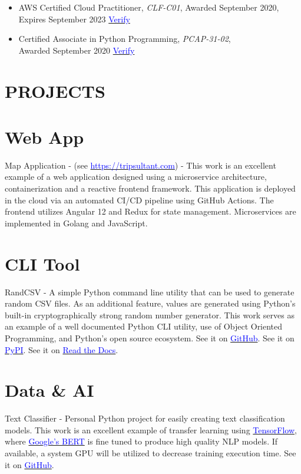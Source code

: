 \documentclass[margin]{res}
\begin{document}
\begin{resume}
\begin{itemize}
		\item AWS Certified Cloud Practitioner, \textit{CLF-C01}, Awarded September 2020, Expires September 2023
		      \href{https://www.youracclaim.com/badges/48063b2f-6f7f-4b6c-a040-5c42393c4bc0}{\textcolor{blue}{Verify}}


		\item Certified Associate in Python Programming, \textit{PCAP-31-02}, \\
		      Awarded September 2020 \href{https://www.youracclaim.com/badges/bfd6aae6-1ab4-461b-8a62-f25cfb0bd29d}{\textcolor{blue}{Verify}}

	\end{itemize}

	\section{\textcolor{NavyBlue}{PROJECTS}}
	\normalsize{\section{Web App}}
	Map Application - (see \href{https://tripsultant.com}{\textcolor{blue}{\url{https://tripsultant.com}}}) - This work is an excellent example of a web application
	designed using a microservice architecture, containerization and a reactive frontend framework. This application is deployed in the
	cloud via an automated CI/CD pipeline using GitHub Actions. The frontend utilizes Angular 12 and Redux for state management. Microservices
	are implemented in Golang and JavaScript.
	\normalsize{\section{CLI Tool}}
	RandCSV - A simple Python command line utility that can be used to generate random CSV files.
	As an additional feature, values are generated using Python's built-in cryptographically strong random number generator. 
	This work serves as an example of a well documented Python CLI utility, 
	use of Object Oriented Programming, and Python's open source ecosystem. See it on \href{https://github.com/scriptloom/randcsv}
	{\textcolor{black}{\textcolor{blue}{GitHub}}}. See it on \href{https://pypi.org/project/randcsv/}
	{\textcolor{black}{\textcolor{blue}{PyPI}}}. See it on \href{https://randcsv.readthedocs.io/en/latest/}
	{\textcolor{black}{\textcolor{blue}{Read the Docs}}}.
	\normalsize{\section{Data \& AI}}
	Text Classifier - Personal Python project for easily creating text classification models. This work is an excellent example of transfer learning using \href{https://www.tensorflow.org/}{\textcolor{blue}{TensorFlow}}, where \href{https://arxiv.org/abs/1810.04805}{\textcolor{blue}{Google's BERT}} is fine tuned to produce high quality NLP models. If available, a system GPU will be utilized to decrease training execution time. See it on \href{https://github.com/jameswspears/woodgate}
	{\textcolor{black}{\textcolor{blue}{GitHub}}}.


\end{resume}
\end{document}
